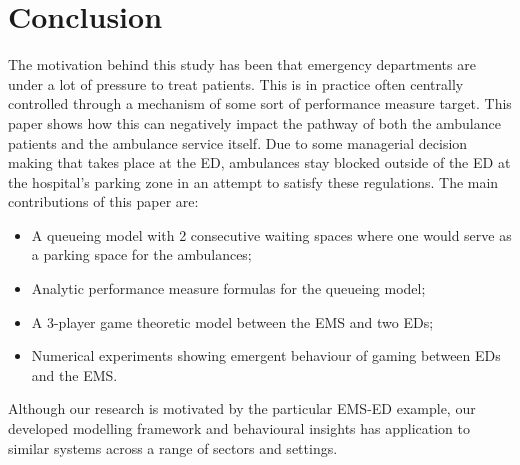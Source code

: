\section{Conclusion}

The motivation behind this study has been that emergency departments are
under a lot of pressure to treat patients.
This is in practice often centrally controlled through a mechanism of some sort
of performance measure target.
This paper shows how this can negatively impact the pathway of both the
ambulance patients and the ambulance service itself.
Due to some managerial decision making that takes place at the ED, ambulances
stay blocked outside of the ED at the hospital's parking zone in an attempt
to satisfy these regulations.
The main contributions of this paper are:
\begin{itemize}
    \item A queueing model with 2 consecutive waiting spaces where one would
    serve as a parking space for the ambulances;
    \item Analytic performance measure formulas for the queueing model;
    \item A 3-player game theoretic model between the EMS and two EDs;
    \item Numerical experiments showing emergent behaviour of gaming between
    EDs and the EMS.
\end{itemize}
Although our research is motivated by the particular EMS-ED example, our 
developed modelling framework and behavioural insights has application to 
similar systems across a range of sectors and settings.


